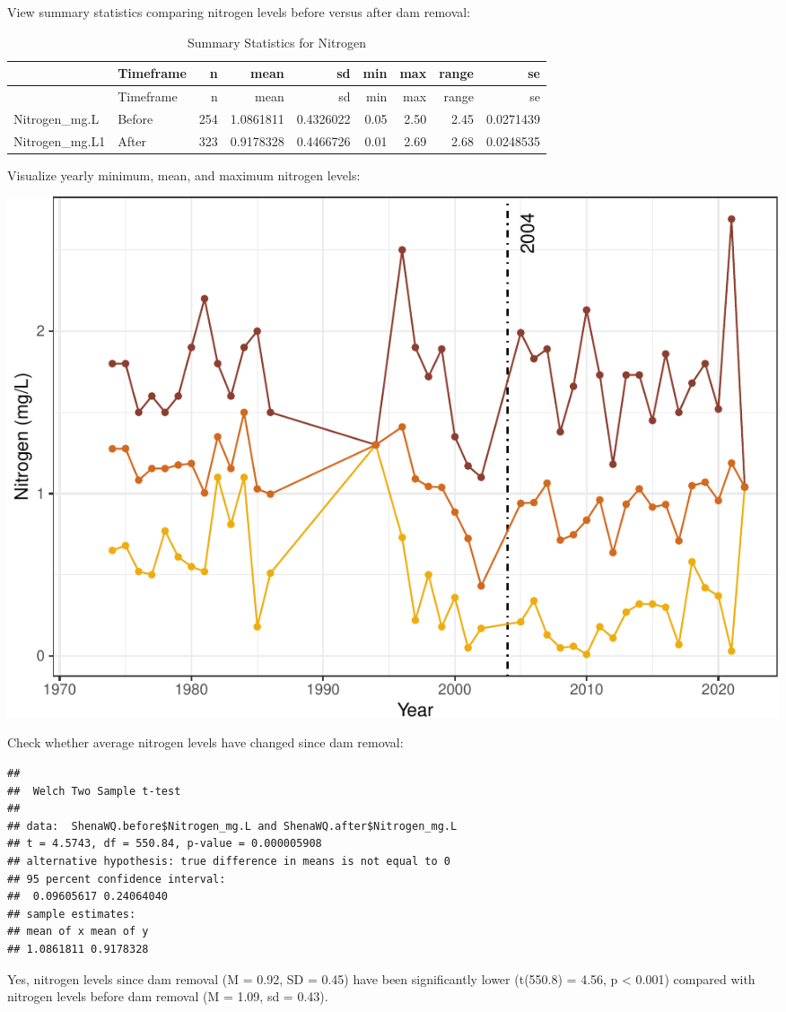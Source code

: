 \documentclass[
  12pt,
]{article}
\begin{document}
View summary statistics comparing nitrogen levels before versus after
dam removal:

\begin{longtable}[]{@{}llrrrrrrr@{}}
\caption{Summary Statistics for Nitrogen}\tabularnewline
\toprule
& Timeframe & n & mean & sd & min & max & range & se \\
\midrule
\endfirsthead
\toprule
& Timeframe & n & mean & sd & min & max & range & se \\
\midrule
\endhead
Nitrogen\_mg.L & Before & 254 & 1.0861811 & 0.4326022 & 0.05 & 2.50 &
2.45 & 0.0271439 \\
Nitrogen\_mg.L1 & After & 323 & 0.9178328 & 0.4466726 & 0.01 & 2.69 &
2.68 & 0.0248535 \\
\bottomrule
\end{longtable}

Visualize yearly minimum, mean, and maximum nitrogen levels:

\includegraphics{Project_Template_files/figure-latex/Nitrogen_Analysis3-1.pdf}

Check whether average nitrogen levels have changed since dam removal:

\begin{verbatim}
## 
##  Welch Two Sample t-test
## 
## data:  ShenaWQ.before$Nitrogen_mg.L and ShenaWQ.after$Nitrogen_mg.L
## t = 4.5743, df = 550.84, p-value = 0.000005908
## alternative hypothesis: true difference in means is not equal to 0
## 95 percent confidence interval:
##  0.09605617 0.24064040
## sample estimates:
## mean of x mean of y 
## 1.0861811 0.9178328
\end{verbatim}

Yes, nitrogen levels since dam removal (M = 0.92, SD = 0.45) have been
significantly lower (t(550.8) = 4.56, p \textless{} 0.001) compared with
nitrogen levels before dam removal (M = 1.09, sd = 0.43).
\end{document}
